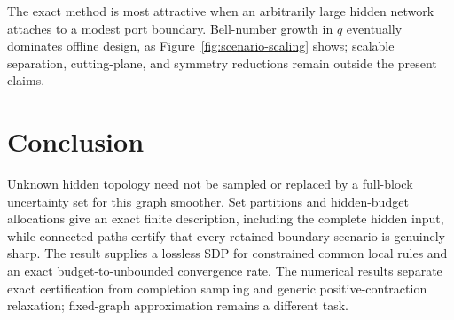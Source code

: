 \documentclass[journal,10pt]{IEEEtran}
\theoremstyle{definition}
\theoremstyle{remark}
\begin{document}
The exact method is most attractive when an arbitrarily large hidden network
attaches to a modest port boundary.  Bell-number growth in $q$ eventually
dominates offline design, as Figure~\ref{fig:scenario-scaling} shows; scalable
separation, cutting-plane, and symmetry reductions remain outside the present
claims.

\section{Conclusion}

Unknown hidden topology need not be sampled or replaced by a full-block
uncertainty set for this graph smoother.  Set partitions and hidden-budget
allocations give an exact finite description, including the complete hidden
input, while connected paths certify that every retained boundary scenario is
genuinely sharp.  The result supplies a lossless SDP for constrained common
local rules and an exact budget-to-unbounded convergence rate.  The numerical
results separate exact certification from completion sampling and generic
positive-contraction relaxation; fixed-graph approximation remains a different
task.


\begingroup
\sloppy

\endgroup
\end{document}
